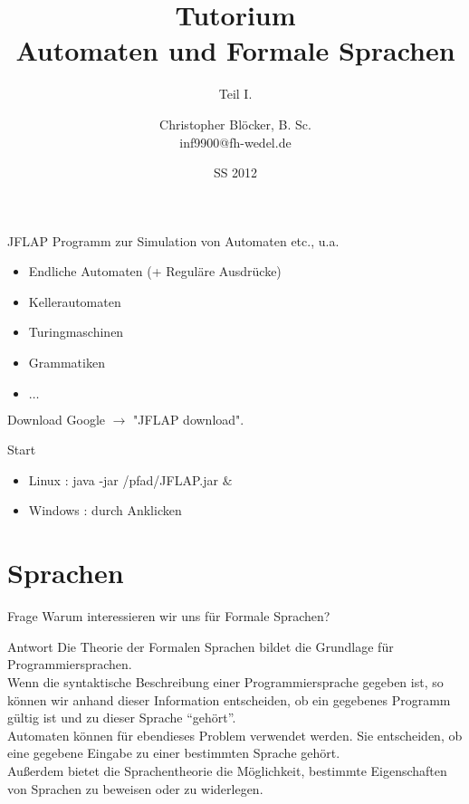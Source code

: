 \documentclass[]{beamer}
\author[Christopher Blöcker, B. Sc.]{Christopher Blöcker, B. Sc.\\ inf9900@fh-wedel.de}
\title[AFS Tutorium]{Tutorium\\Automaten und Formale Sprachen}
\date{SS 2012}
\subtitle{Teil I.}
\begin{document}
\begin{frame}{}
  \titlepage
\end{frame}

\begin{frame}[squeeze]{}
  \begin{block}{JFLAP}
    Programm zur Simulation von Automaten etc., u.a.
    \begin{itemize}
      \item Endliche Automaten (+ Reguläre Ausdrücke)
      \item Kellerautomaten
      \item Turingmaschinen
      \item Grammatiken
      \item $\ldots$
    \end{itemize}
  \end{block}
  
  \begin{exampleblock}{Download}
    Google $\rightarrow$ "JFLAP download".
  \end{exampleblock}
  
  \begin{exampleblock}{Start}
    \begin{itemize}
      \item Linux : java -jar /pfad/JFLAP.jar $\&$
      \item Windows : durch Anklicken
    \end{itemize}
  \end{exampleblock}
\end{frame}

\section{Sprachen}
\begin{frame}[<+->][squeeze]{}
  \begin{alertblock}{Frage}
    Warum interessieren wir uns für Formale Sprachen?
  \end{alertblock}
  
  \begin{exampleblock}{Antwort}
    Die Theorie der Formalen Sprachen bildet die Grundlage für Programmiersprachen. \\
    \vspace*{0.5em}
    Wenn die syntaktische Beschreibung einer Programmiersprache gegeben ist, so können wir anhand dieser Information entscheiden, ob ein gegebenes Programm gültig ist und zu dieser Sprache \enquote{gehört}. \\
    \vspace*{0.5em}
    Automaten können für ebendieses Problem verwendet werden. Sie entscheiden, ob eine gegebene Eingabe zu einer bestimmten Sprache gehört. \\
    \vspace*{0.5em}
    Außerdem bietet die Sprachentheorie die Möglichkeit, bestimmte Eigenschaften von Sprachen zu beweisen oder zu widerlegen.
  \end{exampleblock}
\end{frame}
\end{document}
